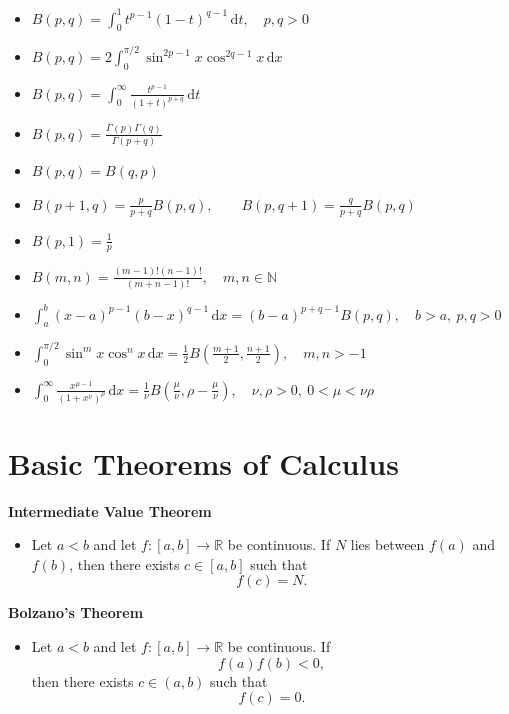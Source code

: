 \documentclass[11pt,a4paper,fleqn]{article}
\newcommand{\dd}{\,\mathrm{d}}
\newcommand{\formulaheading}[1]{%
  \Needspace{4\baselineskip}%
  \par\medskip{\bfseries #1}\par\smallskip%
}
\newenvironment{integrallist}
  {\begin{itemize}[
      label=\(\bullet\),
      leftmargin=1.65em,
      labelsep=0.55em,
      itemsep=0.55em,
      topsep=0.15em,
      parsep=0pt,
      partopsep=0pt
    ]}
  {\end{itemize}}
\newcommand{\theoremheading}[1]{%
  \Needspace{7\baselineskip}%
  \par\vspace{0.3em}\noindent\textbf{#1}\par\nobreak\vspace{-0.25em}%
}
\newenvironment{theoremlist}
  {\begingroup
   \setlength{\abovedisplayskip}{0.3em}%
   \setlength{\belowdisplayskip}{0.3em}%
   \setlength{\abovedisplayshortskip}{0.2em}%
   \setlength{\belowdisplayshortskip}{0.2em}%
   \begin{itemize}[
      label=\(\bullet\),
      leftmargin=1.65em,
      labelsep=0.55em,
      itemsep=0.3em,
      topsep=0pt,
      parsep=0pt,
      partopsep=0pt
    ]}
  {\end{itemize}\endgroup}
\begin{document}
\formulaheading{Beta function}
\begin{integrallist}
\item \(\displaystyle
      B(p,q)=\int_0^1 t^{p-1}(1-t)^{q-1}\dd t,
      \quad p,q>0\)
\item \(\displaystyle
      B(p,q)=2\int_0^{\pi/2}
      \sin^{2p-1}x\cos^{2q-1}x\dd x\)
\item \(\displaystyle
      B(p,q)=\int_0^\infty
      \frac{t^{p-1}}{(1+t)^{p+q}}\dd t\)
\item \(\displaystyle
      B(p,q)=\frac{\Gamma(p)\Gamma(q)}{\Gamma(p+q)}\)
\item \(\displaystyle
      B(p,q)=B(q,p)\)
\item \(\displaystyle
      B(p+1,q)=\frac{p}{p+q}B(p,q),\qquad
      B(p,q+1)=\frac{q}{p+q}B(p,q)\)
\item \(\displaystyle
      B(p,1)=\frac1p\)
\item \(\displaystyle
      B(m,n)=\frac{(m-1)!(n-1)!}{(m+n-1)!},
      \quad m,n\in\mathbb N\)
\item \(\displaystyle
      \int_a^b(x-a)^{p-1}(b-x)^{q-1}\dd x
      =(b-a)^{p+q-1}B(p,q),
      \quad b>a,\ p,q>0\)
\item \(\displaystyle
      \int_0^{\pi/2}\sin^m x\cos^n x\dd x
      =\frac12
       B\!\left(\frac{m+1}{2},\frac{n+1}{2}\right),
      \quad m,n>-1\)
\item \(\displaystyle
      \int_0^\infty\frac{x^{\mu-1}}{(1+x^\nu)^\rho}\dd x
      =\frac1\nu
       B\!\left(\frac{\mu}{\nu},
                \rho-\frac{\mu}{\nu}\right),
      \quad \nu,\rho>0,\ 0<\mu<\nu\rho\)
\end{integrallist}

\section*{Basic Theorems of Calculus}

\theoremheading{Intermediate Value Theorem}
\begin{theoremlist}
\item Let \(a<b\) and let \(f:[a,b]\to\mathbb R\) be continuous.
      If \(N\) lies between \(f(a)\) and \(f(b)\), then there exists
      \(c\in[a,b]\) such that
      \[
      f(c)=N.
      \]
\end{theoremlist}

\theoremheading{Bolzano's Theorem}
\begin{theoremlist}
\item Let \(a<b\) and let \(f:[a,b]\to\mathbb R\) be continuous.
      If
      \[
      f(a)f(b)<0,
      \]
      then there exists \(c\in(a,b)\) such that
      \[
      f(c)=0.
      \]
\end{theoremlist}
\end{document}
